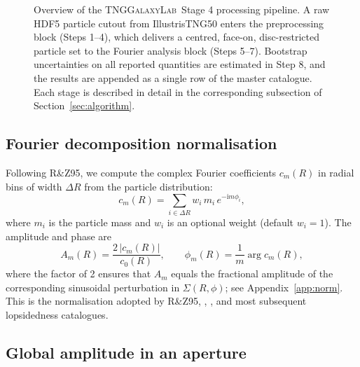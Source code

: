 \documentclass[fleqn,usenatbib]{mnras}
\newcommand{\Am}[1]{A_{#1}}
\newcommand{\pipeline}{\textsc{TNGGalaxyLab}}
\begin{document}
\begin{figure}
\begin{tikzpicture}
  \end{tikzpicture}

  \caption{Overview of the \pipeline\ Stage 4 processing pipeline.
    A raw HDF5 particle cutout from IllustrisTNG50 enters the
    preprocessing block (Steps 1--4), which delivers a centred,
    face-on, disc-restricted particle set to the Fourier analysis
    block (Steps 5--7).  Bootstrap uncertainties on all reported
    quantities are estimated in Step 8, and the results are
    appended as a single row of the master catalogue.  Each stage
    is described in detail in the corresponding subsection of
    Section~\ref{sec:algorithm}.}
  \label{fig:pipeline_flowchart}
\end{figure}



\subsection{Fourier decomposition normalisation}
\label{sec:fourier_norm}

Following R\&Z95, we compute the complex Fourier coefficients
$c_m(R)$ in radial bins of width $\Delta R$ from the particle
distribution:
\begin{equation}
  c_m(R) = \sum_{i \in \Delta R} w_i \, m_i \, e^{-\mathrm{i} m \phi_i},
  \label{eq:cm_particle}
\end{equation}
where $m_i$ is the particle mass and $w_i$ is an optional weight
(default $w_i = 1$).  The amplitude and phase are
\begin{equation}
  \Am{m}(R) = \frac{2\,|c_m(R)|}{c_0(R)}, \qquad
  \phi_m(R) = \frac{1}{m}\arg c_m(R),
  \label{eq:Am_phim}
\end{equation}
where the factor of 2 ensures that $\Am{m}$ equals the fractional
amplitude of the corresponding sinusoidal perturbation in
$\Sigma(R,\phi)$; see Appendix~\ref{app:norm}.  This is the
normalisation adopted by R\&Z95, \citet{2005A&A...438..507B},
\citet{2013ApJ...772..135Z}, and most subsequent lopsidedness
catalogues.

\subsection{Global amplitude in an aperture}
\end{document}
